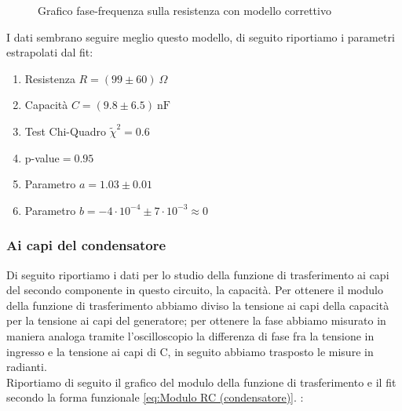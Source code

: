 \documentclass[letterpaper,12pt]{article}
\begin{document}
\begin{figure}[h!]
    \centering
    \caption{Grafico fase-frequenza sulla resistenza con modello correttivo}
    \label{fig:RC_R_fase}
\end{figure}
I dati sembrano seguire meglio questo modello, di seguito riportiamo i parametri estrapolati dal fit:
\begin{enumerate}
    \item Resistenza $R = (99\pm60)\ \Omega$
    \item Capacità $ C = (9.8\pm 6.5)\ \text{nF}$
    \item Test Chi-Quadro  $\widetilde{\chi}^2 = 0.6$
    \item p-value$= 0.95 $
    \item Parametro $ a= 1.03\pm0.01$
    \item Parametro $ b = -4\cdot10^{-4} \pm 7\cdot10^{-3} \approx 0$
\end{enumerate} 
\newpage

\subsubsection{Ai capi del condensatore}
 Di seguito riportiamo i dati per lo studio della funzione di trasferimento ai capi del secondo componente in questo circuito, la capacità.
 Per ottenere il modulo della funzione di trasferimento abbiamo diviso la tensione ai capi della capacità per la tensione ai capi del generatore; per ottenere la fase abbiamo misurato in maniera analoga tramite l'oscilloscopio la differenza di fase fra la tensione in ingresso e la tensione ai capi di C, in seguito abbiamo trasposto le misure in radianti. \\
Riportiamo di seguito il grafico del modulo della funzione di trasferimento e il fit secondo la forma funzionale \ref{eq:Modulo RC (condensatore)}. : \\
\end{document}
